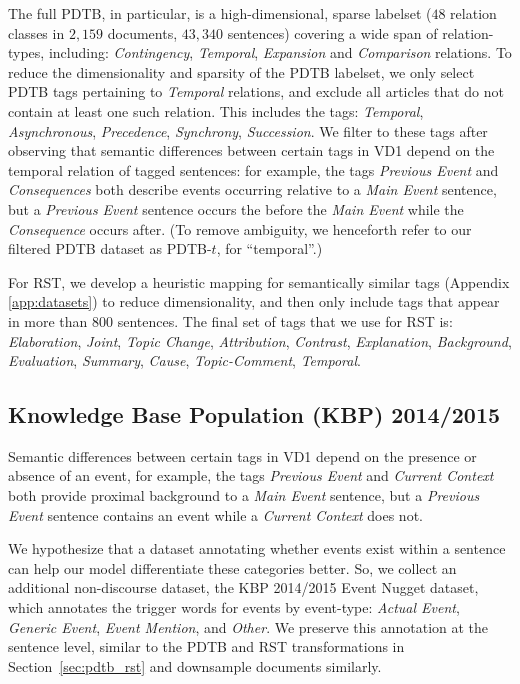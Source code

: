 \documentclass[11pt]{article}
\newcommand\nd{VD1\xspace}
\begin{document}
The full PDTB, in particular, is a high-dimensional, sparse labelset ($48$ relation classes in $2,159$ documents, $43,340$ sentences) covering a wide span of relation-types, including: \textit{Contingency}, \textit{Temporal}, \textit{Expansion} and \textit{Comparison} relations. To reduce the dimensionality and sparsity of the PDTB labelset, we only select PDTB tags pertaining to \textit{Temporal} relations, and exclude all articles that do not contain at least one such relation. This includes the tags: \textit{Temporal}, \textit{Asynchronous}, \textit{Precedence}, \textit{Synchrony}, \textit{Succession}. We filter to these tags after observing that semantic differences between certain tags in \nd depend on the temporal relation of tagged sentences: for example, the tags \textit{Previous Event} and \textit{Consequences} both describe events occurring relative to a \textit{Main Event} sentence, but a \textit{Previous Event} sentence occurs the before the \textit{Main Event} while the \textit{Consequence} occurs after. (To remove ambiguity, we henceforth refer to our filtered PDTB dataset as PDTB-$t$, for ``temporal''.)

For RST, we develop a heuristic mapping for semantically similar tags (Appendix \ref{app:datasets}) to reduce dimensionality, and then only include tags that appear in more than 800 sentences. The final set of tags that we use for RST is: \textit{Elaboration}, \textit{Joint},  \textit{Topic Change},  \textit{Attribution}, \textit{Contrast}, \textit{Explanation}, \textit{Background},
\textit{Evaluation}, \textit{Summary}, \textit{Cause}, \textit{Topic-Comment}, \textit{Temporal}.

\subsection{Knowledge Base Population (KBP) 2014/2015} 
\label{sec:kbp}

Semantic differences between certain tags in \nd depend on the presence or absence of an event, for example, the tags \textit{Previous Event} and \textit{Current Context} both provide proximal background to a \textit{Main Event} sentence, but a \textit{Previous Event} sentence contains an event while a \textit{Current Context} does not. 

We hypothesize that a dataset annotating whether events exist within a sentence can help our model differentiate these categories better. So, we collect an additional non-discourse dataset, the KBP 2014/2015 Event Nugget dataset, which annotates the trigger words for events by event-type: \textit{Actual Event}, \textit{Generic Event}, \textit{Event Mention}, and \textit{Other}. We preserve this annotation at the sentence level, similar to the PDTB and RST transformations in Section~\ref{sec:pdtb_rst} and downsample documents similarly.
\end{document}
